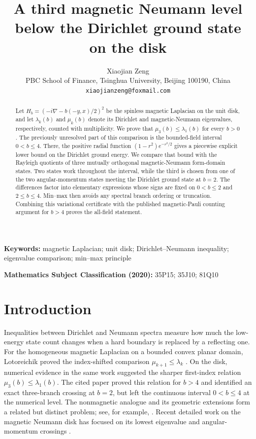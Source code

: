 \documentclass[11pt]{article}
\title{A third magnetic Neumann level below the Dirichlet ground state on the disk}
\author{Xiaojian Zeng\\
\small PBC School of Finance, Tsinghua University, Beijing 100190, China\\
\small \texttt{xiaojianzeng@foxmail.com}}
\date{}
\begin{document}
\maketitle

\begin{abstract}
Let $H_b=(-i\nabla-b(-y,x)/2)^2$ be the spinless magnetic Laplacian on the
unit disk, and let $\lambda_k(b)$ and $\mu_k(b)$ denote its Dirichlet and
magnetic-Neumann eigenvalues, respectively, counted with multiplicity.  We
prove that $\mu_3(b)\leq\lambda_1(b)$ for every $b>0$.  The previously
unresolved part of this comparison is the bounded-field interval
$0<b\leq4$.  There, the positive radial function
$(1-r^2)e^{-r^2/2}$ gives a piecewise explicit lower bound on the
Dirichlet ground energy.  We compare that bound with the Rayleigh quotients
of three mutually orthogonal magnetic-Neumann form-domain states.  Two
states work throughout the interval, while the third is chosen from one of
the two angular-momentum states meeting the Dirichlet ground state at
$b=2$.  The differences factor into elementary expressions whose signs are
fixed on $0<b\leq2$ and $2\leq b\leq4$.  Min--max then avoids any spectral
branch ordering or truncation.  Combining this variational certificate with
the published magnetic-Pauli counting argument for $b>4$ proves the
all-field statement.
\end{abstract}

\noindent\textbf{Keywords:} magnetic Laplacian; unit disk; Dirichlet--Neumann
inequality; eigenvalue comparison; min--max principle

\medskip
\noindent\textbf{Mathematics Subject Classification (2020):}
35P15; 35J10; 81Q10

\section{Introduction}

Inequalities between Dirichlet and Neumann spectra measure how much the
low-energy state count changes when a hard boundary is replaced by a
reflecting one.  For the homogeneous magnetic Laplacian on a bounded convex
planar domain, Lotoreichik proved the index-shifted comparison
$\mu_{k+1}\leq\lambda_k$ \cite{Lotoreichik2025}.  On the disk, numerical
evidence in the same work suggested the sharper first-index relation
$\mu_3(b)\leq\lambda_1(b)$.  The cited paper proved this relation for
$b>4$ and identified an exact three-branch crossing at $b=2$, but left the
continuous interval $0<b\leq4$ at the numerical level.  The nonmagnetic
analogue and its geometric extensions form a related but distinct problem;
see, for example, \cite{Rohleder2025}.  Recent detailed work on the magnetic
Neumann disk has focused on its lowest eigenvalue and angular-momentum
crossings \cite{HelfferLena2025}.
\end{document}

